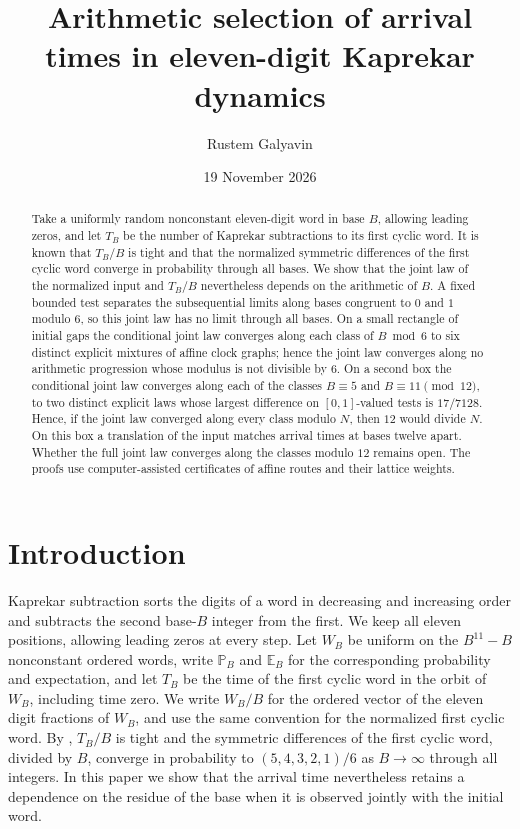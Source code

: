 \documentclass[11pt,reqno]{amsart}
\title[Eleven-digit Kaprekar arrival times]{Arithmetic selection of arrival times in eleven-digit Kaprekar dynamics}
\author{Rustem Galyavin}
\date{19 November 2026}
\theoremstyle{remark}
\newcommand{\E}{\mathbb E}
\newcommand{\Prob}{\mathbb P}
\begin{document}
\begin{abstract}
Take a uniformly random nonconstant eleven-digit word in base \(B\), allowing leading zeros, and let \(T_B\) be the number of Kaprekar subtractions to its first cyclic word. It is known that \(T_B/B\) is tight and that the normalized symmetric differences of the first cyclic word converge in probability through all bases. We show that the joint law of the normalized input and \(T_B/B\) nevertheless depends on the arithmetic of \(B\). A fixed bounded test separates the subsequential limits along bases congruent to \(0\) and \(1\) modulo \(6\), so this joint law has no limit through all bases. On a small rectangle of initial gaps the conditional joint law converges along each class of \(B\bmod 6\) to six distinct explicit mixtures of affine clock graphs; hence the joint law converges along no arithmetic progression whose modulus is not divisible by \(6\). On a second box the conditional joint law converges along each of the classes \(B\equiv5\) and \(B\equiv11\pmod{12}\), to two distinct explicit laws whose largest difference on \([0,1]\)-valued tests is \(17/7128\). Hence, if the joint law converged along every class modulo \(N\), then \(12\) would divide \(N\). On this box a translation of the input matches arrival times at bases twelve apart. Whether the full joint law converges along the classes modulo \(12\) remains open. The proofs use computer-assisted certificates of affine routes and their lattice weights.
\end{abstract}
\maketitle

\section{Introduction}\label{sec:intro}

Kaprekar subtraction sorts the digits of a word in decreasing and increasing order and subtracts the second base-\(B\) integer from the first. We keep all eleven positions, allowing leading zeros at every step. Let \(W_B\) be uniform on the \(B^{11}-B\) nonconstant ordered words, write \(\Prob_B\) and \(\E_B\) for the corresponding probability and expectation, and let \(T_B\) be the time of the first cyclic word in the orbit of \(W_B\), including time zero. We write \(W_B/B\) for the ordered vector of the eleven digit fractions of \(W_B\), and use the same convention for the normalized first cyclic word. By \cite[Theorem~1]{G6}, \(T_B/B\) is tight and the symmetric differences of the first cyclic word, divided by \(B\), converge in probability to \((5,4,3,2,1)/6\) as \(B\to\infty\) through all integers. In this paper we show that the arrival time nevertheless retains a dependence on the residue of the base when it is observed jointly with the initial word.
\end{document}
